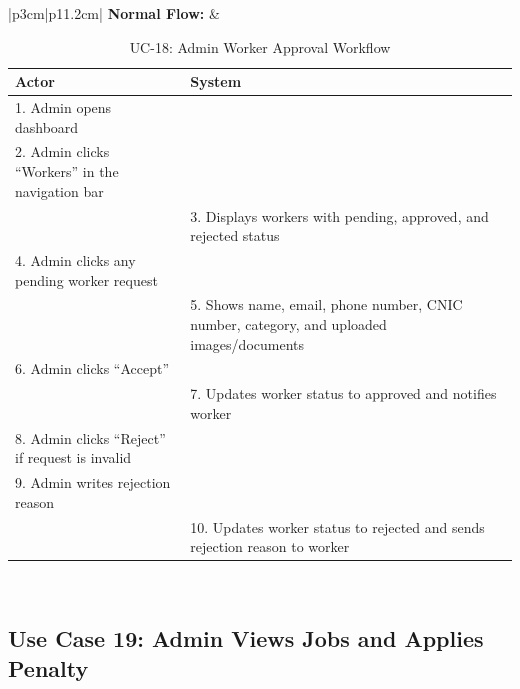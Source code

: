 {\small
\renewcommand{\arraystretch}{1.05}
\begin{table}[H]
\centering
\begin{tabular}{|p{3cm}|p{11.2cm}|}
\hline
\textbf{Normal Flow:} &
\begin{tabular}[t]{|p{5.4cm}|p{5.4cm}|}
\hline
\textbf{Actor} & \textbf{System} \\ \hline
1. Admin opens dashboard & \\ \hline
2. Admin clicks ``Workers'' in the navigation bar & \\ \hline
 & 3. Displays workers with pending, approved, and rejected status \\ \hline
4. Admin clicks any pending worker request & \\ \hline
 & 5. Shows name, email, phone number, CNIC number, category, and uploaded images/documents \\ \hline
6. Admin clicks ``Accept'' & \\ \hline
 & 7. Updates worker status to approved and notifies worker \\ \hline
8. Admin clicks ``Reject'' if request is invalid & \\ \hline
9. Admin writes rejection reason & \\ \hline
 & 10. Updates worker status to rejected and sends rejection reason to worker \\ \hline
\end{tabular} \\ \hline
\end{tabular}
\caption{UC-18: Admin Worker Approval Workflow}
\end{table}
}

\newpage

\subsection*{Use Case 19: Admin Views Jobs and Applies Penalty}

